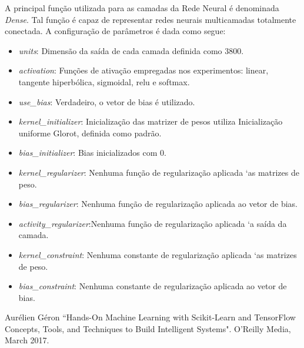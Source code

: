 \documentclass[conference]{IEEEtran}
\begin{document}
A principal função utilizada para as camadas da Rede Neural é denominada \textit{Dense}. Tal função é capaz de representar redes neurais multicamadas totalmente conectada. A configuração de parâmetros é dada como segue:
\begin{itemize}
	\item \textit{units}: Dimensão da saída de cada camada definida como $3800$.
	\item \textit{activation}: Funções de ativação empregadas nos experimentos: linear, tangente hiperbólica, sigmoidal, relu e softmax. 
	\item \textit{use\_bias}: Verdadeiro, o vetor de bias é utilizado.
	\item \textit{kernel\_initializer}: Inicialização das matrizer de pesos utiliza Inicialização uniforme Glorot, definida como padrão.
	\item \textit{bias\_initializer}: Bias inicializados com $0$.
	\item \textit{kernel\_regularizer}: Nenhuma função de regularização aplicada `as matrizes de peso.
	\item \textit{bias\_regularizer}: Nenhuma função de regularização aplicada ao vetor de bias.
	\item \textit{activity\_regularizer}:Nenhuma função de regularização aplicada `a saída da camada.
	\item \textit{kernel\_constraint}: Nenhuma constante de regularização aplicada `as matrizes de peso.
	\item \textit{bias\_constraint}: Nenhuma constante de regularização aplicada ao vetor de bias.
\end{itemize}



\begin{thebibliography}{00}
 Aurélien Géron ``Hands-On Machine Learning with Scikit-Learn and TensorFlow
Concepts, Tools, and Techniques to Build Intelligent Systems". O'Reilly Media, March 2017.
\end{thebibliography}
\end{document}
